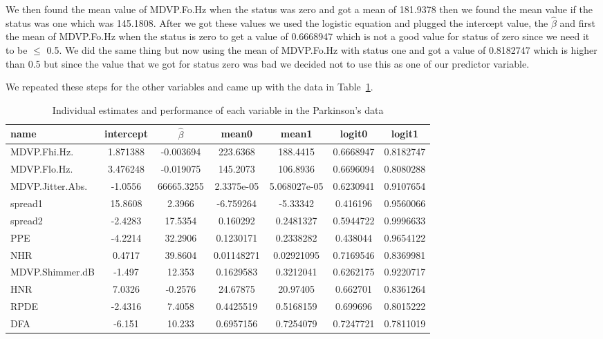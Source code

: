 \documentclass{article}
\begin{document}
We then found the mean value of MDVP.Fo.Hz when the status was zero and got a mean of
181.9378 then we found the mean value if the status was one which was 145.1808. After
we got these values we used the logistic equation and plugged the intercept value, the
$\hat{\beta}$ and first the mean of MDVP.Fo.Hz when the status is zero to get a value of
0.6668947 which is not a good value for status of zero since we need it to be $\leq$ 0.5.
We did the same thing but now using the mean of MDVP.Fo.Hz with status one and got
a value of 0.8182747 which is higher than 0.5 but since the value that we got for
status zero was bad we decided not to use this as one of our predictor variable.

We repeated these steps for the other variables and came up with the data in
Table~\ref{tab:parkinsons}.

\begin{table}[h]
  \centering
\begin{tabular}{|l|c|c|c|c|c|c|}
\hline
name & intercept & $\hat{\beta}$ & mean0 & mean1 & logit0 & logit1 \\
\hline
MDVP.Fhi.Hz. & 1.871388 & -0.003694 & 223.6368 & 188.4415 & 0.6668947 & 0.8182747 \\
\hline
MDVP.Flo.Hz. & 3.476248 & -0.019075 & 145.2073 & 106.8936 & 0.6696094 & 0.8080288 \\
\hline
MDVP.Jitter.Abs. & -1.0556 & 66665.3255 & 2.3375e-05 & 5.068027e-05 & 0.6230941 & 0.9107654 \\
\hline
spread1 & 15.8608 & 2.3966 & -6.759264 & -5.33342 & 0.416196 & 0.9560066 \\
\hline
spread2 & -2.4283 & 17.5354 & 0.160292 & 0.2481327 & 0.5944722 & 0.9996633 \\
\hline
PPE & -4.2214 & 32.2906 & 0.1230171 & 0.2338282 & 0.438044 & 0.9654122 \\
\hline
NHR & 0.4717 & 39.8604 & 0.01148271 & 0.02921095 & 0.7169546 & 0.8369981 \\
\hline
MDVP.Shimmer.dB & -1.497 & 12.353 & 0.1629583 & 0.3212041 & 0.6262175 & 0.9220717 \\
\hline
HNR & 7.0326 & -0.2576 & 24.67875 & 20.97405 & 0.662701 & 0.8361264 \\
\hline
RPDE & -2.4316 & 7.4058 & 0.4425519 & 0.5168159 & 0.699696 & 0.8015222 \\
\hline
DFA & -6.151 & 10.233 & 0.6957156 & 0.7254079 & 0.7247721 & 0.7811019 \\
\hline
\end{tabular}
\caption{Individual estimates and performance of each variable in the
Parkinson's data}
\label{tab:parkinsons}
\end{table}
\end{document}
